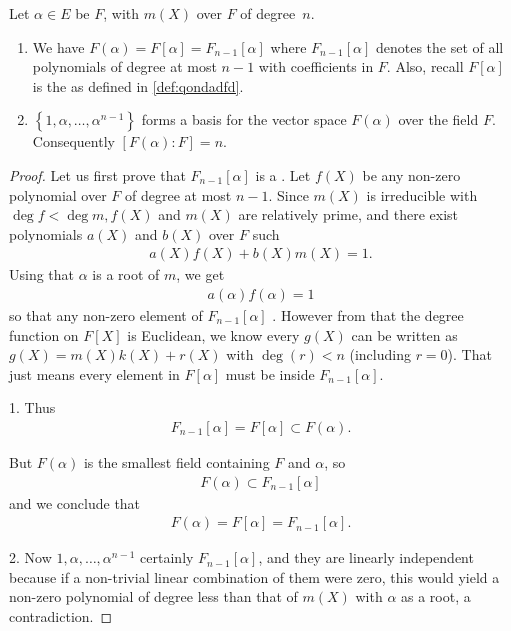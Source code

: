 \documentclass{article}
\begin{document}
\begin{thma}\label{thm:ienqda}
Let $\alpha \in E$ be  $F$, with  $m(X)$ over $F$ of degree~$n$.
\begin{enumerate}
    \item We have $F(\alpha)=F[\alpha]=F_{n-1}[\alpha]$ where $F_{n-1}[\alpha]$ denotes the set of all polynomials of degree at most $n-1$ with coefficients in $F$. Also, recall $F[\alpha]$ is the  as defined in \cref{def:qondadfd}.
    \item $\left\{1, \alpha, \ldots, \alpha^{n-1}\right\}$ forms a basis for the vector space $F(\alpha)$ over the field $F$. Consequently $[F(\alpha): F]=n$.
\end{enumerate} 
\end{thma} 
\begin{proof}
Let us first prove that $F_{n-1}[\alpha]$ is a . Let $f(X)$ be any non-zero polynomial over $F$ of degree at most $n-1$. Since $m(X)$ is irreducible with $\operatorname{deg} f<\operatorname{deg} m, f(X)$ and $m(X)$ are relatively prime, and there exist polynomials $a(X)$ and $b(X)$ over $F$ such
\begin{align*}
a(X) f(X)+b(X) m(X)=1 .
\end{align*}
Using that $\alpha$ is a root of $m$, we get
\begin{align*}
a(\alpha) f(\alpha)=1
\end{align*}
so that any non-zero element of $F_{n-1}[\alpha]$ . However from  that the degree function on $F[X]$ is Euclidean, we know every $g(X)$ can be written as $g(X)=m(X)k(X)+r(X)$ with $\deg(r)<n$ (including $r=0$). That just means every element in $ F[\alpha]$ must be inside $F_{n-1}[\alpha]$.%

1. Thus
\begin{align*}
F_{n-1}[\alpha] = F[\alpha] \subset F(\alpha).
\end{align*}

But $F(\alpha)$ is the smallest field containing $F$ and $\alpha$, so
\begin{align*}
F(\alpha) \subset F_{n-1}[\alpha]
\end{align*}
and we conclude that
\begin{align*}
F(\alpha)=F[\alpha]=F_{n-1}[\alpha] .
\end{align*}

2. Now $1, \alpha, \ldots, \alpha^{n-1}$ certainly  $F_{n-1}[\alpha]$, and they are linearly independent because if a non-trivial linear combination of them were zero, this would yield a non-zero polynomial of degree less than that of $m(X)$ with $\alpha$ as a root, a contradiction.
\end{proof}
\end{document}
